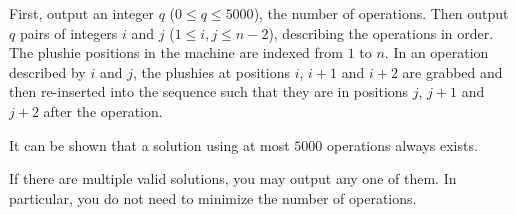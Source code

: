 
  First, output an integer $q$ ($0 \le q \le 5000$), the number of operations.
  Then output $q$ pairs of integers $i$ and $j$ ($1 \le i,j \le n-2$), describing the operations in order.
  The plushie positions in the machine are indexed from $1$ to $n$.
  In an operation described by $i$ and $j$,
  the plushies at positions $i$, $i+1$ and $i+2$ are grabbed and then re-inserted into the sequence
  such that they are in positions $j$, $j+1$ and $j+2$ after the operation.

  It can be shown that a solution using at most $5000$ operations always exists.

  If there are multiple valid solutions, you may output any one of them.
  In particular, you do not need to minimize the number of operations.
